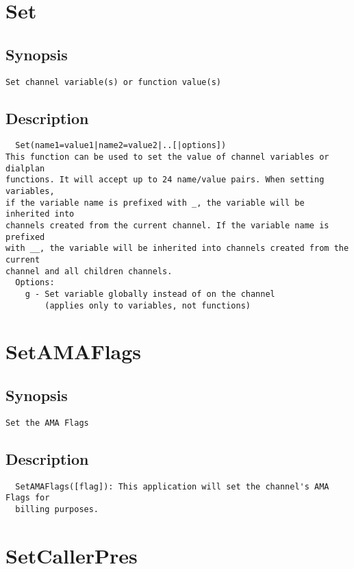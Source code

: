 \section{Set}
\subsection{Synopsis}
\begin{verbatim}
Set channel variable(s) or function value(s)
\end{verbatim}
\subsection{Description}
\begin{verbatim}
  Set(name1=value1|name2=value2|..[|options])
This function can be used to set the value of channel variables or dialplan
functions. It will accept up to 24 name/value pairs. When setting variables,
if the variable name is prefixed with _, the variable will be inherited into
channels created from the current channel. If the variable name is prefixed
with __, the variable will be inherited into channels created from the current
channel and all children channels.
  Options:
    g - Set variable globally instead of on the channel
        (applies only to variables, not functions)

\end{verbatim}


\section{SetAMAFlags}
\subsection{Synopsis}
\begin{verbatim}
Set the AMA Flags
\end{verbatim}
\subsection{Description}
\begin{verbatim}
  SetAMAFlags([flag]): This application will set the channel's AMA Flags for
  billing purposes.

\end{verbatim}


\section{SetCallerPres}
